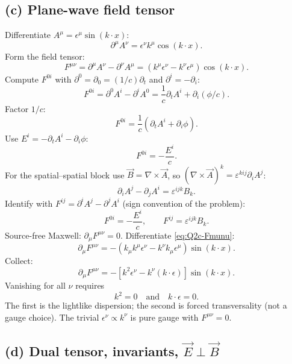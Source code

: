 \documentclass[11pt]{article}
\begin{document}
\subsection*{(c) Plane-wave field tensor}

Differentiate $A^\mu=\epsilon^\mu\sin(k\cdot x)$:
\[ \partial^\mu A^\nu=\epsilon^\nu k^\mu\cos(k\cdot x). \]
Form the field tensor:
\begin{equation}
F^{\mu\nu}=\partial^\mu A^\nu-\partial^\nu A^\mu=(k^\mu\epsilon^\nu-k^\nu\epsilon^\mu)\cos(k\cdot x).
\label{eq:Q2c-Fmunu}
\end{equation}
Compute $F^{0i}$ with $\partial^0=\partial_0=(1/c)\partial_t$ and $\partial^i=-\partial_i$:
\[ F^{0i}=\partial^0 A^i-\partial^i A^0=\frac{1}{c}\partial_t A^i+\partial_i(\phi/c). \]
Factor $1/c$:
\[ F^{0i}=\frac{1}{c}\left(\partial_t A^i+\partial_i\phi\right). \]
Use $E^i=-\partial_t A^i-\partial_i\phi$:
\[ F^{0i}=-\frac{E^i}{c}. \]
For the spatial--spatial block use $\vec B=\nabla\times\vec A$, so $(\nabla\times\vec A)^k=\varepsilon^{kij}\partial_i A^j$:
\[ \partial_i A^j-\partial_j A^i=\varepsilon^{ijk}B_k. \]
Identify with $F^{ij}=\partial^i A^j-\partial^j A^i$ (sign convention of the problem):
\begin{equation}
\boxed{\,F^{0i}=-\frac{E^i}{c},\qquad F^{ij}=\varepsilon^{ijk}B_k.\,}
\end{equation}
Source-free Maxwell: $\partial_\mu F^{\mu\nu}=0$. Differentiate \eqref{eq:Q2c-Fmunu}:
\[ \partial_\mu F^{\mu\nu}=-(k_\mu k^\mu\epsilon^\nu-k^\nu k_\mu\epsilon^\mu)\sin(k\cdot x). \]
Collect:
\[ \partial_\mu F^{\mu\nu}=-[k^2\epsilon^\nu-k^\nu(k\cdot\epsilon)]\sin(k\cdot x). \]
Vanishing for all $\nu$ requires
\[ k^2=0\quad\text{and}\quad k\cdot\epsilon=0. \]
The first is the lightlike dispersion; the second is forced transversality (not a gauge choice). The trivial $\epsilon^\nu\propto k^\nu$ is pure gauge with $F^{\mu\nu}=0$.

\subsection*{(d) Dual tensor, invariants, $\vec E\perp\vec B$}
\end{document}

